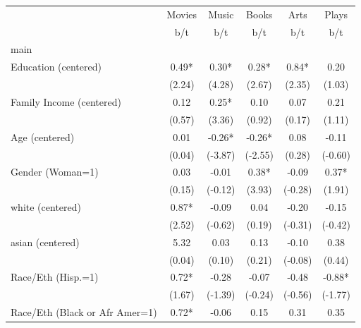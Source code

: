 {
\def\sym#1{\ifmmode^{#1}\else\(^{#1}\)\fi}
\begin{tabular*}{\hsize}{@{\hskip\tabcolsep\extracolsep\fill}l*{5}{c}}
\toprule
                    &\multicolumn{1}{c}{Movies}&\multicolumn{1}{c}{Music}&\multicolumn{1}{c}{Books}&\multicolumn{1}{c}{Arts}&\multicolumn{1}{c}{Plays}\\
                    &         b/t &         b/t &         b/t &         b/t &         b/t \\
\midrule
main                &             &             &             &             &             \\
Education (centered)&        0.49*&        0.30*&        0.28*&        0.84*&        0.20 \\
                    &      (2.24) &      (4.28) &      (2.67) &      (2.35) &      (1.03) \\
Family Income (centered)&        0.12 &        0.25*&        0.10 &        0.07 &        0.21 \\
                    &      (0.57) &      (3.36) &      (0.92) &      (0.17) &      (1.11) \\
Age (centered)      &        0.01 &       -0.26*&       -0.26*&        0.08 &       -0.11 \\
                    &      (0.04) &     (-3.87) &     (-2.55) &      (0.28) &     (-0.60) \\
Gender (Woman=1)    &        0.03 &       -0.01 &        0.38*&       -0.09 &        0.37*\\
                    &      (0.15) &     (-0.12) &      (3.93) &     (-0.28) &      (1.91) \\
white (centered)    &        0.87*&       -0.09 &        0.04 &       -0.20 &       -0.15 \\
                    &      (2.52) &     (-0.62) &      (0.19) &     (-0.31) &     (-0.42) \\
asian (centered)    &        5.32 &        0.03 &        0.13 &       -0.10 &        0.38 \\
                    &      (0.04) &      (0.10) &      (0.21) &     (-0.08) &      (0.44) \\
Race/Eth (Hisp.=1)  &        0.72*&       -0.28 &       -0.07 &       -0.48 &       -0.88*\\
                    &      (1.67) &     (-1.39) &     (-0.24) &     (-0.56) &     (-1.77) \\
Race/Eth (Black or Afr Amer=1)&        0.72*&       -0.06 &        0.15 &        0.31 &        0.35 \\

\end{tabular*}}
